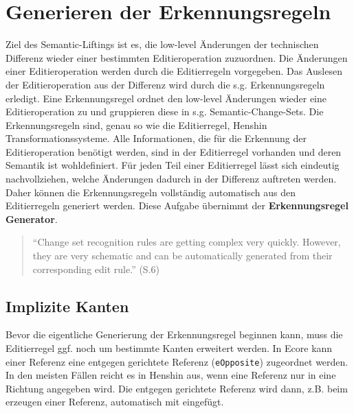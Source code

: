 \chapter{Generieren der Erkennungsregeln}
\label{generierung}

Ziel des Semantic-Liftings ist es, die low-level Änderungen der technischen Differenz wieder einer
bestimmten Editieroperation zuzuordnen. Die Änderungen einer Editieroperation werden durch die
Editierregeln vorgegeben. Das Auslesen der Editieroperation aus der Differenz wird durch die s.g.
Erkennungsregeln erledigt. Eine Erkennungsregel ordnet den low-level Änderungen wieder eine
Editieroperation zu und gruppieren diese in s.g. Semantic-Change-Sets. Die Erkennungsregeln sind,
genau so wie die Editierregel, Henshin Transformationssysteme. Alle Informationen, die für die
Erkennung der Editieroperation benötigt werden, sind in der Editierregel vorhanden und deren
Semantik ist wohldefiniert. Für jeden Teil einer Editierregel lässt sich eindeutig nachvollziehen,
welche Änderungen dadurch in der Differenz auftreten werden. Daher können die Erkennungsregeln
vollständig automatisch aus den Editierregeln generiert werden. Diese Aufgabe übernimmt der
\textbf{Erkennungsregel Generator}.
\begin{quote}
"`Change set recognition rules are getting complex very quickly. However, they are very schematic
and can be automatically generated from their corresponding edit rule."' \cite{KeKT2011ASE} (S.6)
\end{quote}

\section{Implizite Kanten}
\label{implicit_edge}

Bevor die eigentliche Generierung der Erkennungsregel beginnen kann, muss die Editierregel ggf. noch
um bestimmte Kanten erweitert werden. In Ecore kann einer Referenz eine entgegen gerichtete Referenz
(\texttt{eOpposite}) zugeordnet werden. In den meisten Fällen reicht es in Henshin aus, wenn eine
Referenz nur in eine Richtung angegeben wird. Die entgegen gerichtete Referenz wird dann, z.B. beim
erzeugen einer Referenz, automatisch mit eingefügt.

